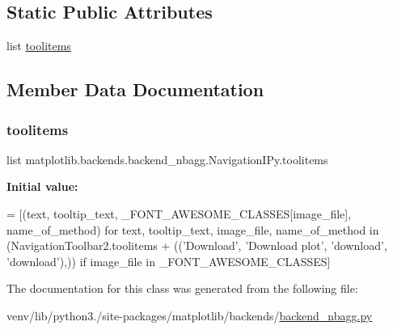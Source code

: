 \subsection*{Static Public Attributes}
\begin{DoxyCompactItemize}
\item 
list \hyperlink{classmatplotlib_1_1backends_1_1backend__nbagg_1_1NavigationIPy_a9d647b6ee75431904e32219aa847fc91}{toolitems}
\end{DoxyCompactItemize}


\subsection{Member Data Documentation}
\mbox{\label{classmatplotlib_1_1backends_1_1backend__nbagg_1_1NavigationIPy_a9d647b6ee75431904e32219aa847fc91}} 
\subsubsection{\texorpdfstring{toolitems}{toolitems}}
{\footnotesize\ttfamily list matplotlib.\+backends.\+backend\+\_\+nbagg.\+Navigation\+I\+Py.\+toolitems\hspace{0.3cm}{\ttfamily [static]}}

{\bfseries Initial value\+:}
\begin{DoxyCode}
=  [(text, tooltip\_text,
                  \_FONT\_AWESOME\_CLASSES[image\_file], name\_of\_method)
                 \textcolor{keywordflow}{for} text, tooltip\_text, image\_file, name\_of\_method
                 \textcolor{keywordflow}{in} (NavigationToolbar2.toolitems +
                     ((\textcolor{stringliteral}{'Download'}, \textcolor{stringliteral}{'Download plot'}, \textcolor{stringliteral}{'download'}, \textcolor{stringliteral}{'download'}),))
                 \textcolor{keywordflow}{if} image\_file \textcolor{keywordflow}{in} \_FONT\_AWESOME\_CLASSES]
\end{DoxyCode}


The documentation for this class was generated from the following file\+:\begin{DoxyCompactItemize}
\item 
venv/lib/python3./site-\/packages/matplotlib/backends/\hyperlink{backend__nbagg_8py}{backend\+\_\+nbagg.\+py}\end{DoxyCompactItemize}
